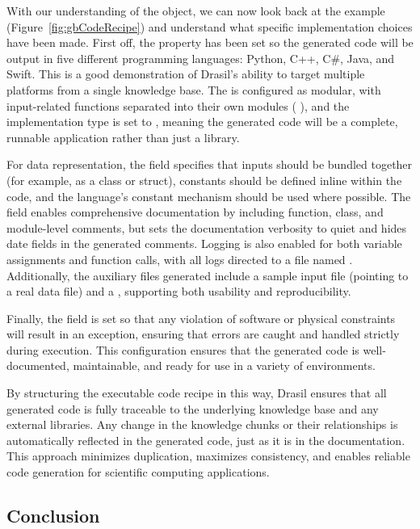 With our understanding of the  object, we can now look back at 
the \gb{} example (Figure~\ref{fig:gbCodeRecipe}) and understand what 
specific implementation choices have been made. First off, the  
property has been set so the generated code will be output in five different 
programming languages: Python, C++, C\#, Java, and Swift. This is a good 
demonstration of Drasil's ability to target multiple platforms from a 
single knowledge base. The  is configured as modular, with 
input-related functions separated into their own modules (
), and the implementation type is set to 
, meaning the generated code will be a complete, runnable 
application rather than just a library. 

For data representation, the  field specifies that inputs 
should be bundled together (for example, as a class or struct), constants 
should be defined inline within the code, and the language's constant mechanism 
should be used where possible. The  field enables comprehensive 
documentation by including function, class, and module-level comments, but sets 
the documentation verbosity to quiet and hides date fields in the generated 
comments. Logging is also enabled for both variable assignments and function 
calls, with all logs directed to a file named . Additionally, 
the auxiliary files generated include a sample input file (pointing to a real 
data file) and a , supporting both usability and reproducibility. 

Finally, the  field is set so that any violation of 
software or physical constraints will result in an exception, ensuring that 
errors are caught and handled strictly during execution. This configuration 
ensures that the generated \gb{} code is well-documented, maintainable, and 
ready for use in a variety of environments.

By structuring the executable code recipe in this way, Drasil ensures that all 
generated code is fully traceable to the underlying knowledge base and any 
external libraries. Any change in the knowledge chunks or their relationships 
is automatically reflected in the generated code, just as it is in the 
documentation. This approach minimizes duplication, maximizes consistency, and 
enables reliable code generation for scientific computing applications.

\subsection{Conclusion}

